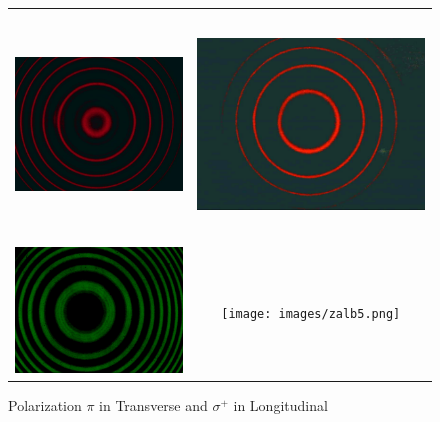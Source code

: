 \documentclass[a4paper,12pt,abstracton]{scrartcl}
\begin{document}
\begin{figure}[H]
    \centering
    \begin{tabular}{c c}
      \includegraphics[height=6cm,keepaspectratio]{images/znb5.png} & \includegraphics[height=6cm,keepaspectratio]{images/znlb8.png} \\
      \includegraphics[width=7.5cm,keepaspectratio]{images/zab4.png} & \texttt{[image: images/zalb5.png]} \\
      \end{tabular}
    \caption{Polarization $\pi$ in Transverse and $\sigma^{+}$ in Longitudinal}
    \label{fig:pb}
\end{figure}
\end{document}
